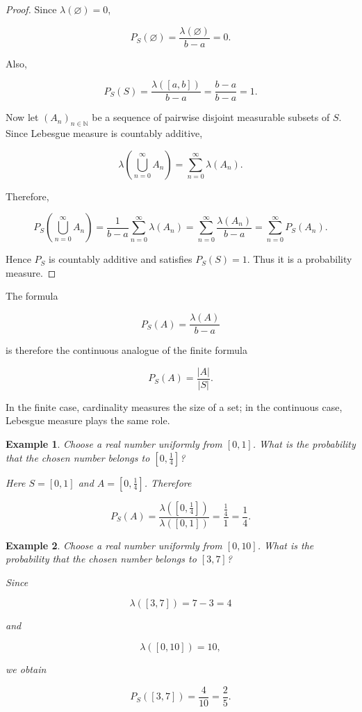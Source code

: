 \documentclass[10pt,a4paper]{book}
\newtheorem{example}{Example}[section]
\begin{document}
\begin{proof}

    Since $\lambda(\varnothing)=0$,

    $$
        P_S(\varnothing)=\frac{\lambda(\varnothing)}{b-a}=0.
    $$

    Also,

    $$
        P_S(S)=\frac{\lambda([a,b])}{b-a}
        =\frac{b-a}{b-a}=1.
    $$

    Now let $(A_n)_{n\in\mathbb N}$ be a sequence of pairwise disjoint measurable subsets of $S$. Since Lebesgue measure is countably additive,

    $$
        \lambda\left(\bigcup_{n=0}^{\infty}A_n\right)
        =
        \sum_{n=0}^{\infty}\lambda(A_n).
    $$

    Therefore,

    $$
        P_S\left(\bigcup_{n=0}^{\infty}A_n\right)
        =
        \frac{1}{b-a}
        \sum_{n=0}^{\infty}\lambda(A_n)
        =
        \sum_{n=0}^{\infty}
        \frac{\lambda(A_n)}{b-a}
        =
        \sum_{n=0}^{\infty}P_S(A_n).
    $$

    Hence $P_S$ is countably additive and satisfies $P_S(S)=1$. Thus it is a probability measure.
\end{proof}

The formula

$$
    P_S(A)=\frac{\lambda(A)}{b-a}
$$

is therefore the continuous analogue of the finite formula

$$
    P_S(A)=\frac{|A|}{|S|}.
$$

In the finite case, cardinality measures the size of a set; in the continuous case, Lebesgue measure plays the same role.

\begin{example}

    Choose a real number uniformly from $[0,1]$. What is the probability that the chosen number belongs to $[0,\frac14]$?

    Here $S=[0,1]$ and $A=[0,\frac14]$. Therefore

    $$
        P_S(A)
        =
        \frac{\lambda([0,\frac14])}{\lambda([0,1])}
        =
        \frac{\frac14}{1}
        =
        \frac14.
    $$

\end{example}

\begin{example}

    Choose a real number uniformly from $[0,10]$. What is the probability that the chosen number belongs to $[3,7]$?

    Since

    $$
        \lambda([3,7])=7-3=4
    $$

    and

    $$
        \lambda([0,10])=10,
    $$

    we obtain

    $$
        P_S([3,7])
        =
        \frac{4}{10}
        =
        \frac25.
    $$

\end{example}
\end{document}
